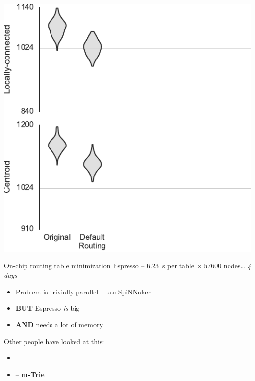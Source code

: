 \documentclass[t]{beamer}
\begin{document}
\begin{frame}[plain]{}
  \begin{center}
    \includegraphics[page=3]{../experiments/presentation_plots}
  \end{center}
\end{frame}

\begin{frame}{On-chip routing table minimization}  %
  Espresso -- \SI{6.23}{\second} per table
  \pause $\times$ \num{57600} nodes\ldots
  \pause \emph{4 days}

  \begin{itemize}
    \item Problem is trivially parallel -- use SpiNNaker
    \item \textbf{BUT} Espresso \emph{is} big
    \item \textbf{AND} needs a lot of memory
  \end{itemize}

  Other people have looked at this:

  \begin{itemize}
    \item {}
    \item {} -- \textbf{m-Trie}
  \end{itemize}
\end{frame}
\end{document}
